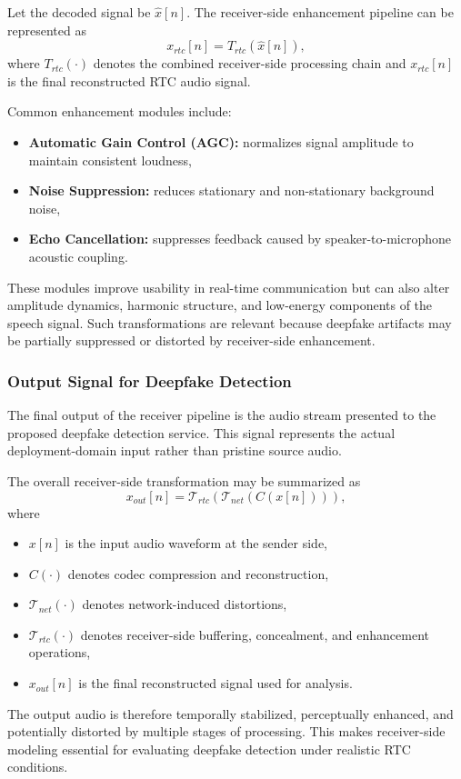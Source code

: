 Let the decoded signal be \(\hat{x}[n]\). The receiver-side enhancement pipeline can be represented as
\begin{equation}
x_{rtc}[n] = T_{rtc}(\hat{x}[n]),
\end{equation}
where \(T_{rtc}(\cdot)\) denotes the combined receiver-side processing chain and \(x_{rtc}[n]\) is the final reconstructed RTC audio signal.

Common enhancement modules include:
\begin{itemize}
    \item \textbf{Automatic Gain Control (AGC):} normalizes signal amplitude to maintain consistent loudness,
    \item \textbf{Noise Suppression:} reduces stationary and non-stationary background noise,
    \item \textbf{Echo Cancellation:} suppresses feedback caused by speaker-to-microphone acoustic coupling.
\end{itemize}

These modules improve usability in real-time communication but can also alter amplitude dynamics, harmonic structure, and low-energy components of the speech signal. Such transformations are relevant because deepfake artifacts may be partially suppressed or distorted by receiver-side enhancement.

\subsubsection{Output Signal for Deepfake Detection}

The final output of the receiver pipeline is the audio stream presented to the proposed deepfake detection service. This signal represents the actual deployment-domain input rather than pristine source audio.

The overall receiver-side transformation may be summarized as
\begin{equation}
x_{out}[n] = \mathcal{T}_{rtc}\!\left(\mathcal{T}_{net}\!\left(C(x[n])\right)\right),
\end{equation}
where
\begin{itemize}
    \item \(x[n]\) is the input audio waveform at the sender side,
    \item \(C(\cdot)\) denotes codec compression and reconstruction,
    \item \(\mathcal{T}_{net}(\cdot)\) denotes network-induced distortions,
    \item \(\mathcal{T}_{rtc}(\cdot)\) denotes receiver-side buffering, concealment, and enhancement operations,
    \item \(x_{out}[n]\) is the final reconstructed signal used for analysis.
\end{itemize}

The output audio is therefore temporally stabilized, perceptually enhanced, and potentially distorted by multiple stages of processing. This makes receiver-side modeling essential for evaluating deepfake detection under realistic RTC conditions.